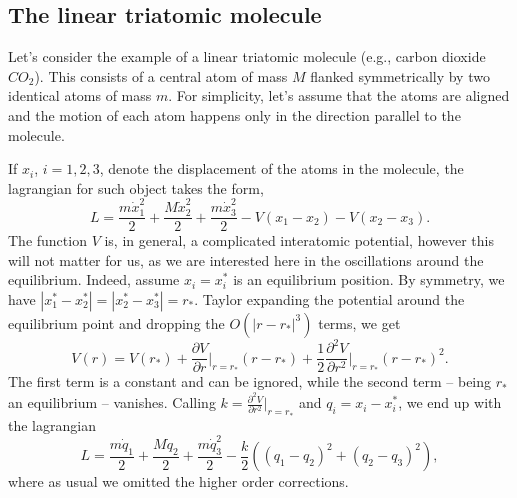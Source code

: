 \documentclass[english,fontsize=11pt,paper=b5]{scrbook}
\theoremstyle{definition}
\begin{document}
    \subsection{The linear triatomic molecule}\label{sec:triatomic}

    Let's consider the example of a linear triatomic molecule (e.g., carbon dioxide $CO_2$).
    This consists of a central atom of mass $M$ flanked symmetrically by two identical atoms of mass $m$.
    For simplicity, let's assume that the atoms are aligned and the motion of each atom happens only in the direction parallel to the molecule.

    If $x_i$, $i=1,2,3$, denote the displacement of the atoms in the molecule, the lagrangian for such object takes the form,
    \begin{equation}
      L = \frac{m\dot x_1^2}2 + \frac{M\dot x_2^2}2 + \frac{m\dot x_3^2}2
      - V(x_1 - x_2) - V(x_2 - x_3).
    \end{equation}
    The function $V$ is, in general, a complicated interatomic potential, however this will not matter for us, as we are interested here in the oscillations around the equilibrium.
    Indeed, assume $x_i = x_i^*$ is an equilibrium position. By symmetry, we have $|x_1^*-x_2^*| = |x_2^* - x_3^*| = r_*$.
    Taylor expanding the potential around the equilibrium point and dropping the $O\left(|r-r_*|^3\right)$ terms, we get
    \begin{equation}
      V(r) = V(r_*) + \frac{\partial V}{\partial r}\Big|_{r=r_*}(r-r_*) + \frac12 \frac{\partial^2 V}{\partial r^2}\Big|_{r=r_*}(r-r_*)^2.
    \end{equation}
    The first term is a constant and can be ignored, while the second term -- being $r_*$ an equilibrium -- vanishes. Calling $k = \frac{\partial^2 V}{\partial r^2}\big|_{r=r_*}$ and $q_i = x_i - x_i^*$, we end up with the lagrangian
    \begin{equation}
      L  = \frac{m \dot q_1}{2} + \frac{M \dot q_2}{2} + \frac{m\dot q_3^2}2 - \frac k2 \left((q_1 - q_2)^2 + (q_2 - q_3)^2\right),
    \end{equation}
    where as usual we omitted the higher order corrections.
\end{document}
